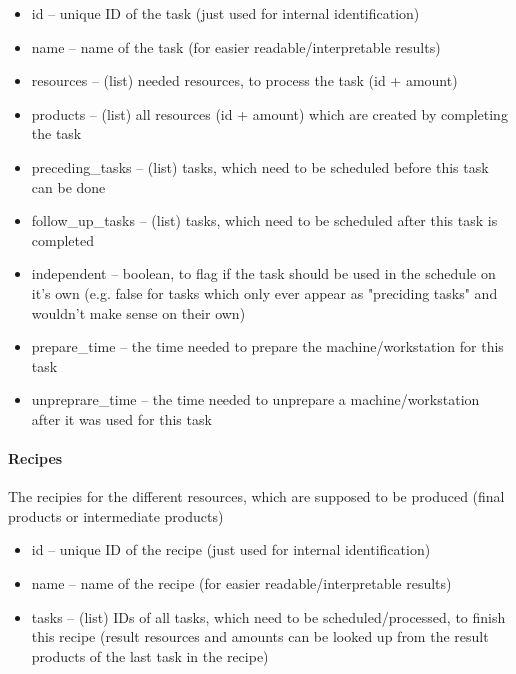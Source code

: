 \documentclass[a4paper,12pt,twoside]{scrreprt}
\begin{document}
\begin{itemize}
	\item id – unique ID of the task (just used for internal identification)
	\item name – name of the task (for easier readable/interpretable results)
	\item resources – (list) needed resources, to process the task (id + amount)
	\item products – (list) all resources (id + amount) which are created by completing the task
	\item preceding\_tasks – (list) tasks, which need to be scheduled before this task can be done
	\item follow\_up\_tasks – (list) tasks, which need to be scheduled after this task is completed
	\item independent – boolean, to flag if the task should be used in the schedule on it's own (e.g. false for tasks which only ever appear as "preciding tasks" and wouldn't make sense on their own)
	\item prepare\_time – the time needed to prepare the machine/workstation for this task
	\item unpreprare\_time – the time needed to unprepare a machine/workstation after it was used for this task
\end{itemize}
\paragraph{Recipes}
The recipies for the different resources, which are supposed to be produced (final products or intermediate products)
\begin{itemize}
	\item id – unique ID of the recipe (just used for internal identification)
	\item name – name of the recipe (for easier readable/interpretable results)
	\item tasks – (list) IDs of all tasks, which need to be scheduled/processed, to finish this recipe (result resources and amounts can be looked up from the result products of the last task in the recipe)
\end{itemize}
\end{document}
